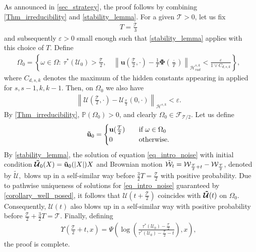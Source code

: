\documentclass[12pt,reqno]{amsart}
\theoremstyle{plain}
\theoremstyle{remark}
\theoremstyle{plain}
\theoremstyle{definition}
\numberwithin{equation}{section}
\numberwithin{equation}{section}
\newcommand{\norm}[1]{\left\|#1\right\|}
\newcommand{\HH}{\mathcal{H}}
\newcommand{\eps}{\varepsilon}
\begin{document}
	\noindent As announced in \autoref{sec_strategy}, the proof follows by combining \autoref{Thm_irreducibility} and \autoref{stability_lemma}. For a given $\mathcal{T}>0$, let us fix \begin{align*}
	    T=\frac{\mathcal{T}}{3}
	\end{align*} and subsequently $ \eps>0$ small enough such that  \autoref{stability_lemma} applies with this choice of $T.$ Define \begin{align*}
	    \Omega_0=\left\{\omega\in \Omega:\ \tau^{*}(\boldsymbol{\mathcal{U}}_0)>\frac{\mathcal{T}}{2},\quad \norm{\mathbf{u}\left(\frac{\mathcal{T}}{2},\cdot\right)-\frac{1}{T}\mathbf{\Phi}\left(\frac{\cdot}{T}\right)}_{\HH_{rad}^{s,k}}<\frac{\eps}{1\vee C_{d,s,k}}\right\},
	\end{align*}where $C_{d,s,k}$ denotes the maximum of the hidden constants appearing in \cite[Proposition A.5, Remark A.6]{glogic2022stable} applied for $s,s-1,k,k-1$. Then, on $\Omega_0$ we also have
	\begin{align*}
		\norm{\boldsymbol{\mathcal{U}}\left(\frac{\mathcal{T}}{2},\cdot\right)-\boldsymbol{\mathcal{U}}_{\frac{\mathcal{T}}{3}}(0,\cdot)}_{\HH^{s,k}}<\eps.
	\end{align*}
	By \autoref{Thm_irreducibility}, $\mathbb{P}(\Omega_0)>0$, and clearly $\Omega_0\in \mathcal{F}_{\mathcal{T}/2}$. Let us define \begin{align*}
		\mathbf{\Tilde{u}}_0=\begin{cases}
			\mathbf{u}(\frac{\mathcal{T}}{2})\quad &\text{if }\omega\in \Omega_0\\
			0\quad &\text{otherwise.}
		\end{cases}
	\end{align*}
	By \autoref{stability_lemma}, the solution of equation \eqref{eq_intro_noise} with initial condition $\boldsymbol{\tilde{\mathcal{U}}}_0(X)=\mathbf{\Tilde{u}}_0(\lvert X\rvert) X$ and Brownian motion $\Tilde{\mathcal{W}}_t=\mathcal{W}_{\frac{\mathcal{T}}{2}+t}-\mathcal{W}_{\frac{\mathcal{T}}{2}}$, denoted by $\boldsymbol{\mathcal{\tilde{U}}},$ blows up in a self-similar way before $\frac{3}{2}T=\frac{\mathcal{T}}{2} $ with positive probability.
	Due to pathwise uniqueness of solutions for \eqref{eq_intro_noise} guaranteed by \autoref{corollary_well_posed}, it follows that $\boldsymbol{\mathcal{U}}(t+\frac{\mathcal{T}}{2})$ coincides with $\boldsymbol{\Tilde{\mathcal{U}}}(t)$ on $\Omega_0.$ Consequently, $\boldsymbol{\mathcal{U}}(t)$ also blows up in a self-similar way with positive probability before $\frac{\mathcal{T}}{2}+\frac{3}{2}T=\mathcal{T}$. Finally, defining \begin{align*}
	    \Upsilon\left(\frac{\mathcal{T}}{2}+t,x\right)=\Psi\left(\log\left(\frac{\tau^{*}(\boldsymbol{\mathcal{U}}_0)-\frac{\mathcal{T}}{2}}{\tau^{*}(\boldsymbol{\mathcal{U}}_0)-\frac{\mathcal{T}}{2}-t}\right),x\right),
	\end{align*} the proof is complete.
	
	
	
	
	
\end{document}
